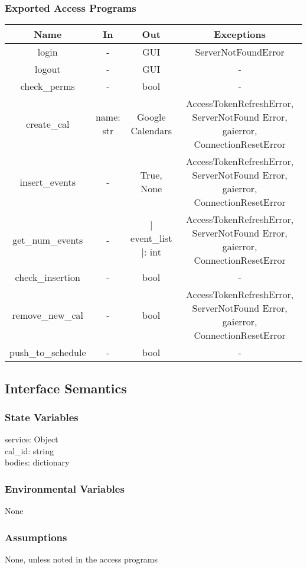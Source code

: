 \documentclass[12pt, titlepage]{article}
\begin{document}
\subsubsection{Exported Access Programs}
\begin{tabular}[pos]{|c|c|c|c|}
	\hline
	\textbf{Name}& \textbf{In} & \textbf{Out} & \textbf{Exceptions} \\ \hline
	login & - & GUI & ServerNotFoundError\\ \hline
	logout & - & GUI & -\\ \hline 
	check\_perms & - & bool & -\\ \hline
	create\_cal & name: str & Google Calendars & AccessTokenRefreshError, ServerNotFound Error, gaierror, ConnectionResetError \\ \hline
	insert\_events & - & True, None & AccessTokenRefreshError, ServerNotFound Error, gaierror, ConnectionResetError\\ \hline
	get\_num\_events & - & $|$event\_list$|$: int & AccessTokenRefreshError, ServerNotFound Error, gaierror, ConnectionResetError \\ \hline
	check\_insertion & - & bool & - \\ \hline
	remove\_new\_cal & - & bool & AccessTokenRefreshError, ServerNotFound Error, gaierror, ConnectionResetError\\ \hline
	push\_to\_schedule & - & bool & -\\ \hline
	
\end{tabular}

\subsection{Interface Semantics}
\subsubsection{State Variables}
service: Object\\
cal\_id: string \\
bodies: dictionary \\
\subsubsection{Environmental Variables}
None
\subsubsection{Assumptions}
None, unless noted in the access programs
\end{document}

